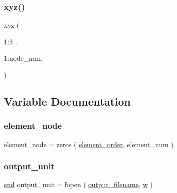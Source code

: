 \mbox{\label{a00614_a6444a221e6b74abaf6d67d44af2650a0}} 
\subsubsection{\texorpdfstring{xyz()}{xyz()}}
{\footnotesize\ttfamily xyz (\begin{DoxyParamCaption}\item[{1\+:3}]{,  }\item[{1\+:node\+\_\+num}]{ }\end{DoxyParamCaption})}



\subsection{Variable Documentation}
\mbox{\label{a00614_a6e1aca963bebde79824bef83587803b7}} 
\subsubsection{\texorpdfstring{element\+\_\+node}{element\_node}}
{\footnotesize\ttfamily element\+\_\+node = zeros ( \hyperlink{a00611_aa77ee84ffb15118601acbd018f243edc}{element\+\_\+order}, element\+\_\+num )}

\mbox{\label{a00614_a21b113ecd24e6ae8a92fa4a149ad8701}} 
\subsubsection{\texorpdfstring{output\+\_\+unit}{output\_unit}}
{\footnotesize\ttfamily \hyperlink{a00608_afb358f48b1646c750fb9da6c6585be2b}{end} output\+\_\+unit = fopen ( \hyperlink{a00617_a5934d690c688edbd92210f38fe5855e7}{output\+\_\+filename}, \textquotesingle{}\hyperlink{a00605_aad57484016654da87125db86f4227ea3}{w}\textquotesingle{} )}

